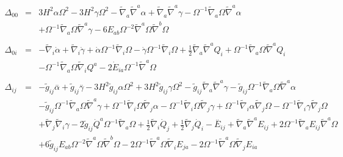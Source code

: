 \documentclass[10pt,letterpaper]{article}
\numberwithin{equation}{section}
\begin{document}
\begin{eqnarray}
\Delta_{00}&=& 3 H^2 \alpha \Omega^2 - 3 H^2 \gamma \Omega^2 -  \tilde{\nabla}_{a}\tilde{\nabla}^{a}\alpha + \tilde{\nabla}_{a}\tilde{\nabla}^{a}\gamma -  \Omega^{-1} \tilde{\nabla}_{a}\Omega \tilde{\nabla}^{a}\alpha \nonumber \\ 
&& + \Omega^{-1} \tilde{\nabla}_{a}\Omega \tilde{\nabla}^{a}\gamma -6 E_{ab} \Omega^{-2} \tilde{\nabla}^{a}\Omega \tilde{\nabla}^{b}\Omega 
\\  \nonumber\\ 
\Delta_{0i}&=& - \tilde{\nabla}_{i}\dot{\alpha} + \tilde{\nabla}_{i}\dot{\gamma} + \dot{\alpha} \Omega^{-1} \tilde{\nabla}_{i}\Omega -  \dot{\gamma} \Omega^{-1} \tilde{\nabla}_{i}\Omega +\tfrac{1}{2} \tilde{\nabla}_{a}\tilde{\nabla}^{a}Q_{i} + \Omega^{-1} \tilde{\nabla}_{a}\Omega \tilde{\nabla}^{a}Q_{i} \nonumber \\ 
&& -  \Omega^{-1} \tilde{\nabla}_{a}\Omega \tilde{\nabla}_{i}Q^{a}-2 \dot{E}_{ia} \Omega^{-1} \tilde{\nabla}^{a}\Omega 
\\  \nonumber\\ 
\Delta_{ij}&=& - \tilde{g}_{ij} \overset{..}{\alpha} + \tilde{g}_{ij} \overset{..}{\gamma} - 3 H^2 \tilde{g}_{ij} \alpha \Omega^2 + 3 H^2 \tilde{g}_{ij} \gamma \Omega^2 -  \tilde{g}_{ij} \tilde{\nabla}_{a}\tilde{\nabla}^{a}\gamma -  \tilde{g}_{ij} \Omega^{-1} \tilde{\nabla}_{a}\Omega \tilde{\nabla}^{a}\alpha \nonumber \\ 
&& -  \tilde{g}_{ij} \Omega^{-1} \tilde{\nabla}_{a}\Omega \tilde{\nabla}^{a}\gamma + \Omega^{-1} \tilde{\nabla}_{i}\Omega \tilde{\nabla}_{j}\alpha -  \Omega^{-1} \tilde{\nabla}_{i}\Omega \tilde{\nabla}_{j}\gamma + \Omega^{-1} \tilde{\nabla}_{i}\alpha \tilde{\nabla}_{j}\Omega -  \Omega^{-1} \tilde{\nabla}_{i}\gamma \tilde{\nabla}_{j}\Omega \nonumber \\ 
&& + \tilde{\nabla}_{j}\tilde{\nabla}_{i}\gamma -2 \tilde{g}_{ij} \dot{Q}^{a} \Omega^{-1} \tilde{\nabla}_{a}\Omega + \tfrac{1}{2} \tilde{\nabla}_{i}\dot{Q}_{j} + \tfrac{1}{2} \tilde{\nabla}_{j}\dot{Q}_{i}- \overset{..}{E}_{ij} + \tilde{\nabla}_{a}\tilde{\nabla}^{a}E_{ij} + 2 \Omega^{-1} \tilde{\nabla}_{a}E_{ij} \tilde{\nabla}^{a}\Omega \nonumber \\ 
&& + 6 \tilde{g}_{ij} E_{ab} \Omega^{-2} \tilde{\nabla}^{a}\Omega \tilde{\nabla}^{b}\Omega - 2 \Omega^{-1} \tilde{\nabla}^{a}\Omega \tilde{\nabla}_{i}E_{ja} - 2 \Omega^{-1} \tilde{\nabla}^{a}\Omega \tilde{\nabla}_{j}E_{ia}
\\  \nonumber\\ 

\end{eqnarray}
\end{document}
